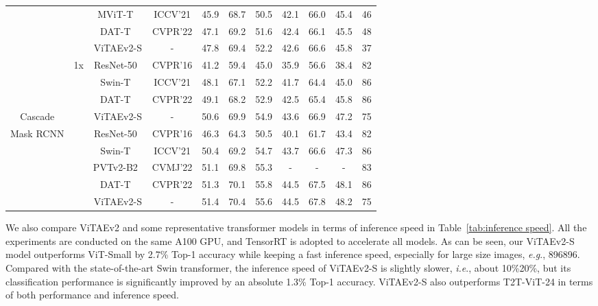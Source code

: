 \documentclass[twocolumn]{svjour3}          \smartqed  \usepackage{natbib}
\newcommand{\ie}{i.e}
\newcommand{\eg}{e.g}
\def\onedot{.\xspace}
\def\eg{\emph{e.g}\onedot}
\def\ie{\emph{i.e}\onedot}
\begin{document}
\begin{table*}[htbp]
{\begin{tabular}{c|c|c|c|ccc|ccc|c}
          &       & MViT-T~\citep{fan2021multiscale} & ICCV'21 & 45.9  & 68.7  & 50.5  & 42.1  & 66.0    & 45.4  & 46 \\
          &       & DAT-T~\citep{xia2022vision} & CVPR'22 & 47.1  & 69.2  & 51.6  & 42.4  & 66.1  & 45.5  & 48 \\
          &       & {ViTAEv2-S} & - & {47.8} & {69.4} & {52.2} & {42.6} & {66.6} & {45.8} & {37} \\
    \hline
          & \multirow{5}[2]{*}{1x} & ResNet-50~\citep{he2016deep} & CVPR'16 & 41.2  & 59.4  & 45.0    & 35.9  & 56.6  & 38.4  & 82 \\
          &       & Swin-T~\citep{liu2021swin} & ICCV'21 & 48.1  & 67.1  & 52.2  & 41.7  & 64.4  & 45.0    & 86 \\
          &       & DAT-T~\citep{xia2022vision} & CVPR'22 & 49.1  & 68.2  & 52.9  & 42.5  & 65.4  & 45.8  & 86 \\
    Cascade  &       & {ViTAEv2-S} & - & {50.6} & {69.9} & {54.9} & {43.6} & {66.9} & {47.2} & {75} \\
\cline{2-11}    Mask RCNN & \multirow{5}[2]{*}{3x} & ResNet-50~\citep{he2016deep} & CVPR'16 & 46.3  & 64.3  & 50.5  & 40.1  & 61.7  & 43.4  & 82 \\
    \citep{cai2019cascade}  &       & Swin-T~\citep{liu2021swin} & ICCV'21 & 50.4  & 69.2  & 54.7  & 43.7  & 66.6  & 47.3  & 86 \\
          &       & PVTv2-B2~\citep{wang2021pvtv2} & CVMJ'22 & 51.1  & 69.8  & 55.3  & - & - & - & 83 \\
          &       & DAT-T~\citep{xia2022vision} & CVPR'22 & 51.3  & 70.1  & 55.8  & 44.5  & 67.5  & 48.1  & 86 \\
          &       & {ViTAEv2-S} & - & {51.4} & {70.4} & {55.6} & {44.5} & {67.8} & {48.2} & {75} \\
    \hline
    \end{tabular}}\label{tab:detection results}\end{table*}


We also compare ViTAEv2 and some representative transformer models in terms of inference speed in Table~\ref{tab:inference speed}. All the experiments are conducted on the same A100 GPU, and TensorRT is adopted to accelerate all models. As can be seen, our ViTAEv2-S model outperforms ViT-Small by 2.7\% Top-1 accuracy while keeping a fast inference speed, especially for large size images, \eg, 896896. Compared with the state-of-the-art Swin transformer, the inference speed of ViTAEv2-S is slightly slower, \ie, about 10\%20\%, but its classification performance is significantly improved by an absolute 1.3\% Top-1 accuracy. ViTAEv2-S also outperforms T2T-ViT-24 in terms of both performance and inference speed.
\end{document}
